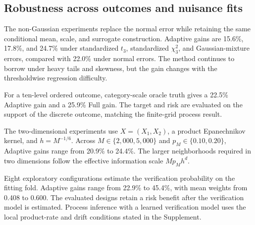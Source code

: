 \subsection{Robustness across outcomes and nuisance fits}

The non-Gaussian experiments replace the normal error while retaining the same
conditional mean, scale, and surrogate construction. Adaptive gains are
15.6\%, 17.8\%, and 24.7\% under standardized \(t_3\), standardized
\(\chi^2_3\), and Gaussian-mixture errors, compared with 22.0\% under normal
errors. The method continues to borrow under heavy tails and skewness, but the
gain changes with the thresholdwise regression difficulty.

For a ten-level ordered outcome, category-scale oracle truth gives a 22.5\%
Adaptive gain and a 25.9\% Full gain. The target and risk are evaluated on the
support of the discrete outcome, matching the finite-grid process result.

The two-dimensional experiments use \(X=(X_1,X_2)\), a product Epanechnikov
kernel, and \(h=M^{-1/6}\). Across \(M\in\{2{,}000,5{,}000\}\) and
\(p_M\in\{0.10,0.20\}\), Adaptive gains range from 20.9\% to 24.4\%. The
larger neighborhoods required in two dimensions follow the effective
information scale \(Mp_Mh^d\).

Eight exploratory configurations estimate the verification probability on the
fitting fold. Adaptive gains range from 22.9\% to 45.4\%, with mean weights
from 0.408 to 0.600. The evaluated designs retain a risk benefit after the
verification model is estimated. Process inference with a
learned verification model uses the local product-rate and drift conditions
stated in the Supplement.
